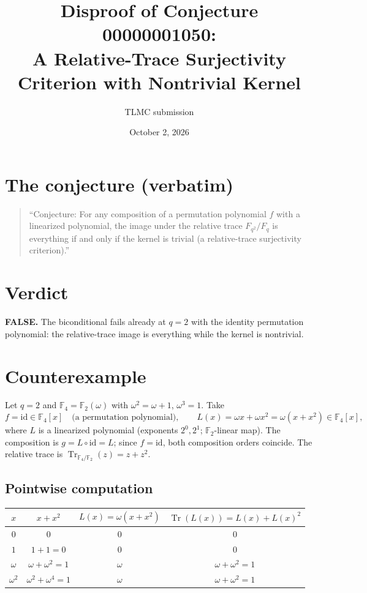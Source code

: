 \documentclass{article}
\title{Disproof of Conjecture 00000001050:\\
A Relative-Trace Surjectivity Criterion with Nontrivial Kernel}
\author{TLMC submission}
\date{October 2, 2026}
\begin{document}
\maketitle

\section{The conjecture (verbatim)}

\begin{quote}
``Conjecture: For any composition of a permutation polynomial $f$ with a linearized
polynomial, the image under the relative trace $F_{q^2}/F_q$ is everything if and
only if the kernel is trivial (a relative-trace surjectivity criterion).''
\end{quote}

\section{Verdict}

\textbf{FALSE.} The biconditional fails already at $q = 2$ with the identity
permutation polynomial: the relative-trace image is everything while the kernel is
nontrivial.

\section{Counterexample}

Let $q = 2$ and $\mathbb{F}_4 = \mathbb{F}_2(\omega)$ with
$\omega^2 = \omega + 1$, $\omega^3 = 1$. Take
\[
f = \mathrm{id} \in \mathbb{F}_4[x] \quad\text{(a permutation polynomial)},\qquad
L(x) = \omega x + \omega x^2 = \omega(x + x^2) \in \mathbb{F}_4[x],
\]
where $L$ is a linearized polynomial (exponents $2^0, 2^1$; $\mathbb{F}_2$-linear
map). The composition is $g = L \circ \mathrm{id} = L$; since $f = \mathrm{id}$,
both composition orders coincide. The relative trace is
$\operatorname{Tr}_{\mathbb{F}_4/\mathbb{F}_2}(z) = z + z^2$.

\subsection{Pointwise computation}

\begin{center}
\begin{tabular}{cccc}
\toprule
$x$ & $x + x^2$ & $L(x) = \omega(x+x^2)$ & $\operatorname{Tr}(L(x)) = L(x) + L(x)^2$ \\
\midrule
$0$ & $0$ & $0$ & $0$ \\
$1$ & $1+1 = 0$ & $0$ & $0$ \\
$\omega$ & $\omega + \omega^2 = 1$ & $\omega$ & $\omega + \omega^2 = 1$ \\
$\omega^2$ & $\omega^2 + \omega^4 = 1$ & $\omega$ & $\omega + \omega^2 = 1$ \\
\bottomrule
\end{tabular}
\end{center}
\end{document}
